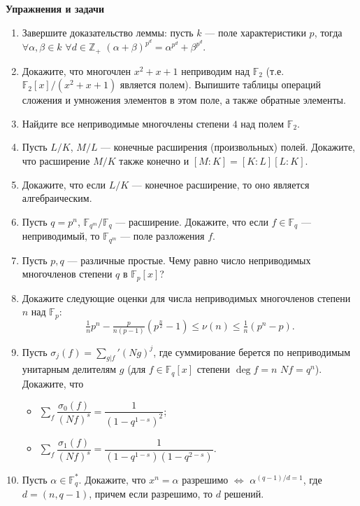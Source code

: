 \noindent\textbf{Упражнения и задачи}

\begin{enumerate}[topsep=0pt]
    \item Завершите доказательство леммы: пусть $k$ --- поле характеристики $p$, тогда $\forall \alpha, \beta \in k$ $\forall d \in \mathbb{Z}_+$ $(\alpha+\beta)^{p^d}=\alpha^{p^d}+\beta^{p^d}$.
    \item Докажите, что многочлен $x^2+x+1$ неприводим над $\mathbb{F}_2$ (т.е. $\mathbb{F}_2[x]/(x^2+x+1)$ является полем). Выпишите таблицы операций сложения и умножения элементов в этом поле, а также обратные элементы.
    \item Найдите все неприводимые многочлены степени $4$ над полем $\mathbb{F}_2$.
    \item Пусть $L/K$, $M/L$ --- конечные расширения (произвольных) полей. Докажите, что расширение $M/K$ также конечно и $[M:K]=[K:L][L:K]$.
    \item Докажите, что если $L/K$ --- конечное расширение, то оно является алгебраическим.
    \item Пусть $q=p^n$, $\mathbb{F}_{q^m}/\mathbb{F}_q$ --- расширение. Докажите, что если $f\in\mathbb{F}_q$ --- неприводимый, то $\mathbb{F}_{q^m}$ --- поле разложения $f$.
    \item Пусть $p,q$ --- различные простые. Чему равно число неприводимых многочленов степени $q$ в $\mathbb{F}_p[x]$? %
    \item Докажите следующие оценки для числа неприводимых многочленов степени $n$ над $\mathbb{F}_p$:
    $$
    \tfrac{1}{n} p^n - \tfrac{p}{n(p-1)}(p^{\frac{n}{2}}-1) \leqslant \nu(n) \leqslant \tfrac{1}{n}(p^n-p).
    $$
    \item Пусть $\sigma_j(f) = \sum_{g|f}' (Ng)^j$, где суммирование берется по неприводимым унитарным делителям $g$ (для $f\in\mathbb{F}_q[x]$ степени $\deg f = n$ $Nf=q^n$). Докажите, что
    \begin{itemize}[noitemsep,topsep=0pt]
        \item $\sum\limits_f \dfrac{\sigma_0(f)}{(Nf)^s} = \dfrac{1}{(1-q^{1-s})^2}$;
        \item $\sum\limits_f \dfrac{\sigma_1(f)}{(Nf)^s} = \dfrac{1}{(1-q^{1-s})(1-q^{2-s})}$.
    \end{itemize} %
    \item Пусть $\alpha \in \mathbb{F}_q^*$. Докажите, что $x^n=\alpha$ разрешимо $\Leftrightarrow$ $\alpha^{(q-1)/d=1}$, где $d=(n,q-1)$, причем если разрешимо, то $d$ решений. %

\end{enumerate}
